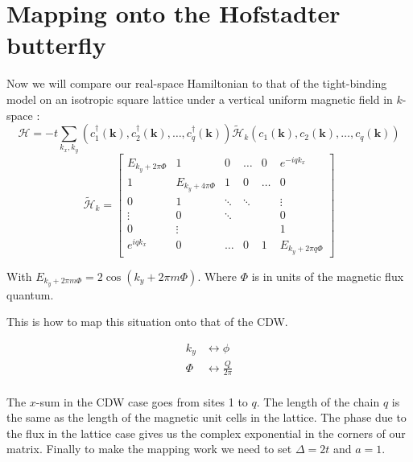 \documentclass[letterpaper, 10 pt, conference]{ieeeconf}  %
\begin{document}
\smallskip





\section{Mapping onto the Hofstadter butterfly}
Now we will compare our real-space Hamiltonian to that of the tight-binding model on an
isotropic square lattice under a vertical uniform magnetic field in $k$-space \cite{yoshioka2015}:
$$
\mathcal{H}=-t\sum_{k_{x},k_{y}}(c_{1}^{\dagger}(\textbf{k}),c_{2}^{\dagger}(\textbf{k}),\dots,c_{q}^{\dagger}(\textbf{k}))\tilde{\mathcal{H}}_{k}(c_{1}(\textbf{k}),c_{2}(\textbf{k}),\dots,c_{q}(\textbf{k}))
$$
$$
\tilde{\mathcal{H}}_{k}=\begin{bmatrix}
E_{k_{y}+2\pi \Phi}      & 1     & 0      & \hdots     & 0     & e^{-iqk_{x}}  \\
1    &E_{k_{y}+4\pi \Phi} & 1 & 0 & \hdots     & 0 \\
0               & 1 & \ddots & \ddots  &  &\vdots \\
\vdots   & 0 & \ddots &  &  &  0  \\
0 &  \vdots    &  &  &  & 1 \\
e^{iqk_{x}} & 0 &    \hdots          &0   & 1      & E_{k_{y}+2\pi q\Phi}
\end{bmatrix}
$$

With $E_{k_{y}+2\pi m\Phi}=2\cos(k_{y}+2\pi m\Phi)$. Where $\Phi$ is in units of the magnetic flux quantum.

This is how to map this situation onto that of the CDW.

\begin{align*}
k_{y} &\leftrightarrow \phi  \\
\Phi &\leftrightarrow \frac{Q}{2\pi} \\
\end{align*}

The $x$-sum in the CDW case goes from sites 1 to $q$.
The length of the chain $q$ is the same as the length of the magnetic unit cells in the lattice.
The phase due to the flux in the lattice case gives us the complex exponential in the corners of our matrix.
Finally to make the mapping work we need to set $\Delta = 2t$ and $a=1$.
\end{document}
